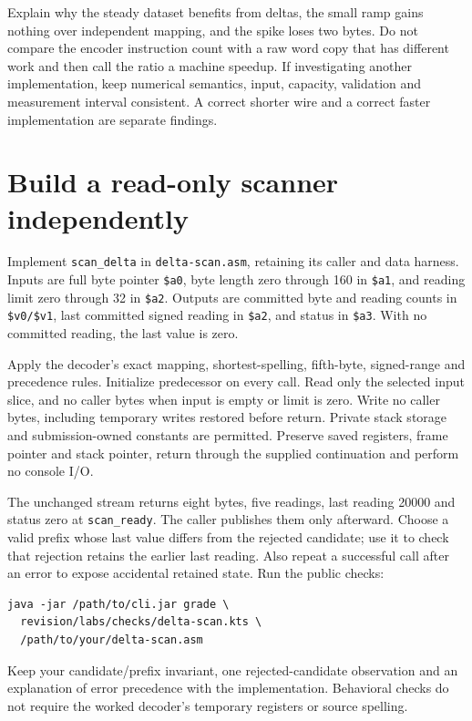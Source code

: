 Explain why the steady dataset benefits from deltas, the small ramp gains
nothing over independent mapping, and the spike loses two bytes. Do not compare
the encoder instruction count with a raw word copy that has different work and
then call the ratio a machine speedup. If investigating another implementation,
keep numerical semantics, input, capacity, validation and measurement interval
consistent. A correct shorter wire and a correct faster implementation are
separate findings.

\section{Build a read-only scanner independently}

Implement \texttt{scan\_delta} in \texttt{delta-scan.asm}, retaining its caller
and data harness. Inputs are full byte pointer \texttt{\$a0}, byte length zero
through 160 in \texttt{\$a1}, and reading limit zero through 32 in
\texttt{\$a2}. Outputs are committed byte and reading counts in
\texttt{\$v0/\$v1}, last committed signed reading in \texttt{\$a2}, and
status in \texttt{\$a3}. With no committed reading, the last value is zero.

Apply the decoder's exact mapping, shortest-spelling, fifth-byte, signed-range
and precedence rules. Initialize predecessor on every call. Read only the
selected input slice, and no caller bytes when input is empty or limit is zero.
Write no caller bytes, including temporary writes restored before return.
Private stack storage and submission-owned constants are permitted. Preserve
saved registers, frame pointer and stack pointer, return through the supplied
continuation and perform no console I/O.

The unchanged stream returns eight bytes, five readings, last reading 20000 and
status zero at \texttt{scan\_ready}. The caller publishes them only afterward.
Choose a valid prefix whose last value differs from the rejected candidate;
use it to check that rejection retains the earlier last reading. Also repeat a
successful call after an error to expose accidental retained state.
Run the public checks:
\begin{verbatim}
java -jar /path/to/cli.jar grade \
  revision/labs/checks/delta-scan.kts \
  /path/to/your/delta-scan.asm
\end{verbatim}
Keep your candidate/prefix invariant, one rejected-candidate observation and an
explanation of error precedence with the implementation. Behavioral checks do
not require the worked decoder's temporary registers or source spelling.

